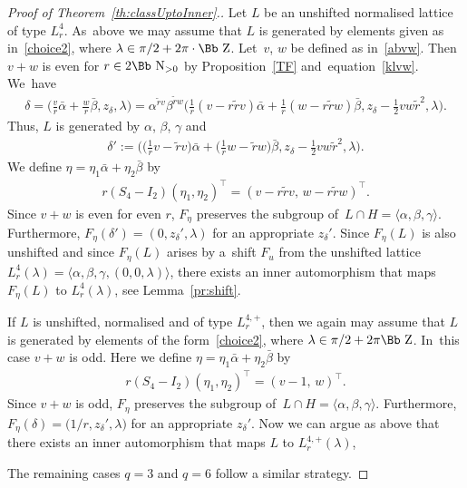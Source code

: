 \documentclass[pdftex]{sigma}
\newcommand\NN{{\mbox{\Bb N}}}
\newcommand\ZZ{{\mbox{\Bb Z}}}
\newcommand\la{\langle}
\newcommand\ra{\rangle}
\numberwithin{equation}{section}
\begin{document}
\begin{proof}[Proof of Theorem~\ref{th:classUptoInner}.]
Let $L$ be an unshifted normalised lattice of type $L^4_r$. As~above we may assume that $L$ is generated by elements given as in~\eqref{choice2}, where $\lambda\in\pi/2+2\pi\cdot\ZZ$. Let~$v$, $w$ be defined as in~\eqref{abvw}. Then $v+w$ is even for $r\in2\NN_{>0}$ by Proposition~\ref{TF} and~equation~\eqref{klvw}. We~have
\begin{gather*}
\delta= \bigg(\frac{v}{r}\bar\alpha+\frac{w}{r}\bar\beta,z_\delta,\lambda\bigg)
= \alpha^{\tilde rv}\beta^{\tilde rw}\bigg(\frac{1}{r}(v-r\tilde rv)\bar\alpha+\frac{1}{r}(w-r\tilde rw)\bar\beta,z_\delta-\frac12 vw\tilde r^2,\lambda\bigg).
\end{gather*}
Thus, $L$ is generated by $\alpha$, $\beta$, $\gamma$ and
\begin{gather*}
\delta':=\bigg(\bigg(\frac{1}{r}v-\tilde rv\bigg)\bar\alpha+\bigg(\frac{1}{r}w-\tilde rw\bigg)\bar\beta,z_\delta-\frac12 vw\tilde r^2,\lambda\bigg).
\end{gather*}
We define $\eta=\eta_1\bar \alpha +\eta_2\bar\beta$ by
\begin{gather*}
r(S_4-I_2)(\eta_1,\eta_2)^\top=(v-r\tilde rv,\,w-r\tilde rw)^\top.
\end{gather*}
Since $v+w$ is even for even $r$, $F_{\eta}$ preserves the subgroup of~$L\cap H=\la \alpha,\beta,\gamma\ra$. Furthermore, $F_{\eta}(\delta')=(0,z_\delta',\lambda)$ for an appropriate $z_\delta'$. Since $F_\eta(L)$ is also unshifted and since $F_\eta(L)$ arises by a~shift $F_u$ from the unshifted lattice $L^4_r(\lambda)=\big\langle\alpha,\beta,\gamma,(0,0,\lambda)\big\rangle$, there exists an inner automorphism that maps $F_{ \eta}(L)$ to $L^4_r(\lambda)$,
see Lemma~\ref{pr:shift}.

If $L$ is unshifted, normalised and of type $L^{4,+}_r$, then we again may assume that $L$ is generated by elements of the form~\eqref{choice2}, where $\lambda\in\pi/2+2\pi \ZZ$. In~this case $v+w$ is odd. Here we define $\eta=\eta_1\bar \alpha +\eta_2\bar\beta$ by
\begin{gather*}
r(S_4-I_2)(\eta_1,\eta_2)^\top=(v-1,\,w)^\top.
\end{gather*}
Since $v+w$ is odd, $F_{\eta}$ preserves the subgroup of~$L\cap H=\la \alpha,\beta,\gamma\ra$. Furthermore, $F_{\eta}(\delta)=\big(1/r,z_\delta',\lambda\big)$ for an appropriate $z_\delta'$. Now we can argue as above that there exists an inner automorphism that maps $L$ to $L^{4,+}_r(\lambda)$,

The remaining cases $q=3$ and $q=6$ follow a similar strategy.
\end{proof}
\end{document}

